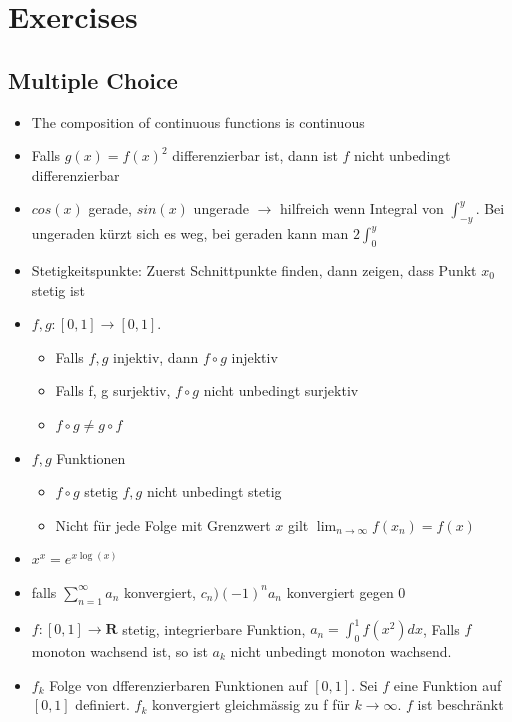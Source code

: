 \documentclass[8pt]{extarticle}
\begin{document}
\begin{multicols*}{3}
\begin{itemize}
\end{itemize}


\newpage

\section{Exercises}
\subsection{Multiple Choice}
\begin{itemize}
 \item The composition of continuous functions is continuous
 \item Falls $g(x) = f(x)^2$ differenzierbar ist, dann ist $f$ nicht unbedingt differenzierbar
 \item $cos(x)$ gerade, $sin(x)$ ungerade $\rightarrow$ hilfreich wenn Integral von $\int_{-y}^{y}$. Bei ungeraden kürzt sich es weg, bei geraden kann man $2\int_{0}^{y}$
 \item Stetigkeitspunkte: Zuerst Schnittpunkte finden, dann zeigen, dass Punkt $x_0$ stetig ist
 \item $f, g : [0, 1] \rightarrow [0, 1]$. 
\begin{itemize}
 \item Falls $f, g$ injektiv, dann $f \circ g$ injektiv
 \item Falls f, g surjektiv, $f \circ g$ nicht unbedingt surjektiv
 \item $f \circ g \neq g \circ f$
\end{itemize}
 \item $f, g$ Funktionen
\begin{itemize}
 \item $f \circ g$ stetig $f, g$ nicht unbedingt stetig
 \item Nicht für jede Folge mit Grenzwert $x$ gilt $\lim_{n \to  \infty} f(x_n) = f(x)$
\end{itemize}
 \item $x^x = e ^{x\log(x)}$
 \item falls $\sum_{n = 1}^{\infty} a_n$ konvergiert, $c_n ) (-1)^n a_n$ konvergiert gegen 0
 \item $f: [0, 1] \rightarrow \mathbf{R}$ stetig, integrierbare Funktion, $a_n = \int_{0}^{1} f(x^2) dx$, Falls $f$ monoton wachsend ist, so ist $a_k$ nicht unbedingt monoton wachsend.
 \item $f_k$ Folge von dfferenzierbaren Funktionen auf $[0, 1]$. Sei $f$ eine Funktion auf $[0, 1]$ definiert. $f_k$ konvergiert gleichmässig zu f für $k \rightarrow \infty$. $f$ ist beschränkt

\end{itemize}
\end{multicols*}
\end{document}
